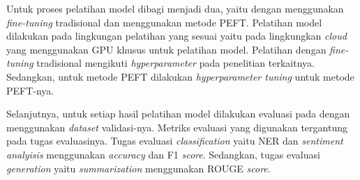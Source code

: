Untuk proses pelatihan model  dibagi menjadi dua, yaitu dengan menggunakan \textit{fine-tuning} tradisional dan menggunakan metode PEFT. Pelatihan model  dilakukan pada lingkungan pelatihan yang sesuai yaitu pada lingkungkan \textit{cloud} yang menggunakan GPU khusus untuk pelatihan model. Pelatihan dengan \textit{fine-tuning} tradisional  mengikuti \textit{hyperparameter} pada penelitian terkaitnya. Sedangkan, untuk metode PEFT  dilakukan \textit{hyperparameter tuning} untuk metode PEFT-nya.

Selanjutnya, untuk setiap hasil pelatihan model  dilakukan evaluasi pada dengan menggunakan \textit{dataset} validasi-nya. Metriks evaluasi yang  digunakan tergantung pada tugas evaluasinya. Tugas evaluasi \textit{classification} yaitu NER dan \textit{sentiment analyisis}  menggunakan \textit{accuracy} dan F1 \textit{score}. Sedangkan, tugas evaluasi \textit{generation} yaitu \textit{summarization}  menggunakan ROUGE \textit{score}.

